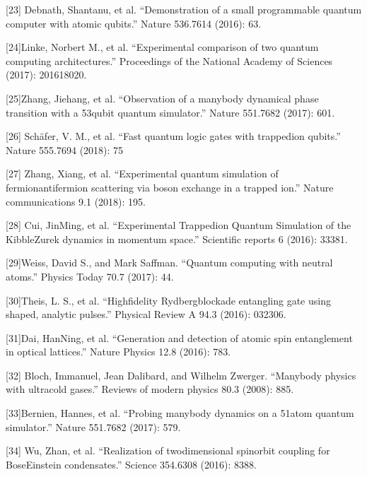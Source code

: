 \documentclass[a4paper,11pt,english]{sphinxmanual}
\begin{document}
\sphinxAtStartPar
{[}23{]} Debnath, Shantanu, et al. “Demonstration of a small programmable quantum computer with atomic qubits.” Nature 536.7614 (2016): 63.

\sphinxAtStartPar
{[}24{]}Linke, Norbert M., et al. “Experimental comparison of two quantum computing architectures.” Proceedings of the National Academy of Sciences (2017): 201618020.

\sphinxAtStartPar
{[}25{]}Zhang, Jiehang, et al. “Observation of a many\sphinxhyphen{}body dynamical phase transition with a 53\sphinxhyphen{}qubit quantum simulator.” Nature 551.7682 (2017): 601.

\sphinxAtStartPar
{[}26{]} Schäfer, V. M., et al. “Fast quantum logic gates with trapped\sphinxhyphen{}ion qubits.” Nature 555.7694 (2018): 75

\sphinxAtStartPar
{[}27{]} Zhang, Xiang, et al. “Experimental quantum simulation of fermion\sphinxhyphen{}antifermion scattering via boson exchange in a trapped ion.” Nature communications 9.1 (2018): 195.

\sphinxAtStartPar
{[}28{]} Cui, Jin\sphinxhyphen{}Ming, et al. “Experimental Trapped\sphinxhyphen{}ion Quantum Simulation of the Kibble\sphinxhyphen{}Zurek dynamics in momentum space.” Scientific reports 6 (2016): 33381.

\sphinxAtStartPar
{[}29{]}Weiss, David S., and Mark Saffman. “Quantum computing with neutral atoms.” Physics Today 70.7 (2017): 44.

\sphinxAtStartPar
{[}30{]}Theis, L. S., et al. “High\sphinxhyphen{}fidelity Rydberg\sphinxhyphen{}blockade entangling gate using shaped, analytic pulses.” Physical Review A 94.3 (2016): 032306.

\sphinxAtStartPar
{[}31{]}Dai, Han\sphinxhyphen{}Ning, et al. “Generation and detection of atomic spin entanglement in optical lattices.” Nature Physics 12.8 (2016): 783.

\sphinxAtStartPar
{[}32{]} Bloch, Immanuel, Jean Dalibard, and Wilhelm Zwerger. “Many\sphinxhyphen{}body physics with ultracold gases.” Reviews of modern physics 80.3 (2008): 885.

\sphinxAtStartPar
{[}33{]}Bernien, Hannes, et al. “Probing many\sphinxhyphen{}body dynamics on a 51\sphinxhyphen{}atom quantum simulator.” Nature 551.7682 (2017): 579.

\sphinxAtStartPar
{[}34{]} Wu, Zhan, et al. “Realization of two\sphinxhyphen{}dimensional spin\sphinxhyphen{}orbit coupling for Bose\sphinxhyphen{}Einstein condensates.” Science 354.6308 (2016): 83\sphinxhyphen{}88.
\end{document}
